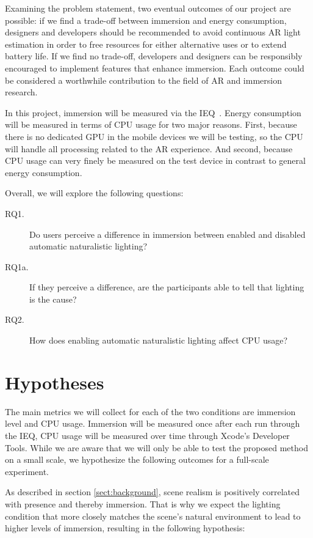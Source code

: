 \documentclass[12pt,twoside,english]{article}
\begin{document}
Examining the problem statement, two eventual outcomes of our project are possible:
if we find a trade-off between immersion and energy consumption, designers and developers should be recommended to avoid continuous \gls{AR} light estimation in order to free resources for either alternative uses or to extend battery life.
If we find no trade-off, developers and designers can be responsibly encouraged to implement features that enhance immersion.
Each outcome could be considered a worthwhile contribution to the field of \gls{AR} and immersion research.

In this project, immersion will be measured via the \gls{IEQ}~\cite{jennett_measuring_2008}.
Energy consumption will be measured in terms of \gls{CPU} usage for two major reasons.
First, because there is no dedicated \gls{GPU} in the mobile devices we will be testing, so the \gls{CPU} will handle all processing related to the \gls{AR} experience.
And second, because CPU usage can very finely be measured on the test device in contrast to general energy consumption.

Overall, we will explore the following questions:

\begin{description}
    \item[RQ1.] Do users perceive a difference in immersion between enabled and disabled automatic naturalistic lighting?
    \item[RQ1a.] If they perceive a difference, are the participants able to tell that lighting is the cause?
    \item[RQ2.] How does enabling automatic naturalistic lighting affect \gls{CPU} usage?
\end{description}

\section{Hypotheses}
\label{sect:hypotheses}

The main metrics we will collect for each of the two conditions are immersion level and \gls{CPU} usage.
Immersion will be measured once after each run through the \gls{IEQ}, \gls{CPU} usage will be measured over time through Xcode's Developer Tools.
While we are aware that we will only be able to test the proposed method on a small scale, we hypothesize the following outcomes for a full-scale experiment.

As described in section \ref{sect:background}, scene realism is positively correlated with presence and thereby immersion.
That is why we expect the lighting condition that more closely matches the scene's natural environment to lead to higher levels of immersion, resulting in the following hypothesis:
\end{document}
